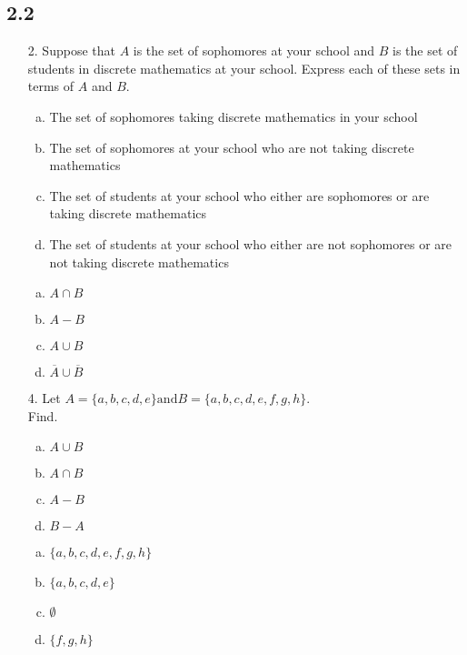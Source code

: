 \subsection{2.2}
\begin{itemize}
   \item[2.] Suppose that $A$ is the set of sophomores at your school and $B$ is the set of students in discrete mathematics at your school. Express each of these sets in terms of $A$ and $B$.
         \begin{enumerate}[a.]
            \item The set of sophomores taking discrete mathematics in your school
            \item The set of sophomores at your school who are not taking discrete mathematics
            \item The set of students at your school who either are sophomores or are taking discrete mathematics
            \item The set of students at your school who either are not sophomores or are not taking discrete mathematics
         \end{enumerate}
         \begin{enumerate}[a.]
            \item $A \cap B$
            \item $A - B$
            \item $A \cup B$
            \item $\overline{A} \cup \overline{B}$
         \end{enumerate}
   \item[4.] Let $A = \{a, b, c, d, e\} \text{and} B = \{a, b, c, d, e, f, g, h\}.$ \\
         Find.
         \begin{enumerate}[a.]
            \item $A \cup B$
            \item $A \cap B$
            \item $A - B$
            \item $B - A$
         \end{enumerate}
         \answer
         \begin{enumerate}[a.]
            \item $\{a, b, c, d, e, f, g, h\}$
            \item $\{a, b, c, d, e\}$
            \item $\emptyset$
            \item $\{f, g, h\}$
         \end{enumerate}

\end{itemize}
